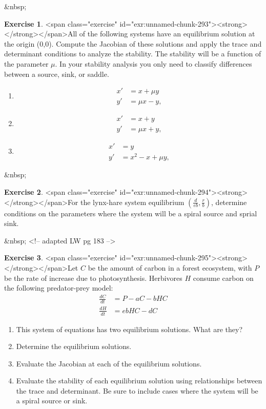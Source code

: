 \documentclass[
]{book}
\theoremstyle{definition}
\theoremstyle{definition}
\theoremstyle{definition}
\newtheorem{exercise}{Exercise}[chapter]
\theoremstyle{remark}
\begin{document}
&nbsp;
\begin{exercise}
<span class="exercise" id="exr:unnamed-chunk-293"><strong>\label{exr:unnamed-chunk-293} </strong></span>All of the following systems have an equilibrium solution at the origin (0,0).  Compute the Jacobian of these solutions and apply the trace and determinant conditions to analyze the stability.  The stability will be a function of the parameter $\mu$.  In your stability analysis you only need to classify differences between a source, sink, or saddle.

\begin{enumerate}[label=\alph*.]
\item \begin{align*}
x' &=x+ \mu y \\
y' &= \mu x -y,
\end{align*}
\item \begin{align*}
x' &=x+y\\
y' &= \mu x +y,
\end{align*}
\item \begin{align*}
x' &= y \\
y' &=x^{2}-x+\mu y,
\end{align*}
\end{enumerate}
\end{exercise}
&nbsp;


\begin{exercise}
<span class="exercise" id="exr:unnamed-chunk-294"><strong>\label{exr:unnamed-chunk-294} </strong></span>For the lynx-hare system equilibrium $\displaystyle \left( \frac{d}{eb}, \frac{r}{b} \right)$, determine conditions on the parameters where the system will be a spiral source and sprial sink.
\end{exercise}

&nbsp;
<!-- adapted LW pg 183 -->
\begin{exercise}
<span class="exercise" id="exr:unnamed-chunk-295"><strong>\label{exr:unnamed-chunk-295} </strong></span>Let $C$ be the amount of carbon in a forest ecosystem, with $P$ be the rate of increase due to photosynthesis.  Herbivores $H$ consume carbon on the following predator-prey model:
    \begin{align*}
\frac{dC}{dt}&=P - aC - bHC \\
\frac{dH}{dt} &= ebHC-dC
\end{align*}

\begin{enumerate}
\item This system of equations has two equilibrium solutions.  What are they?
\item Determine the equilibrium solutions.
\item Evaluate the Jacobian at each of the equilibrium solutions.
\item Evaluate the stability of each equilibrium solution using relationships between the trace and determinant. Be sure to include cases where the system will be a spiral source or sink.
\end{enumerate}
\end{exercise}
\end{document}
